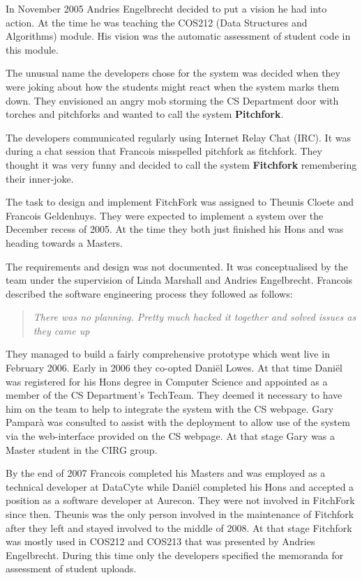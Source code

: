 In November 2005 Andries Engelbrecht decided to put a vision he had into action. At the time he was teaching the COS212 (Data Structures and Algorithms) module. His vision was the automatic assessment of student code in this module. 


The unusual name the developers chose for the system was decided when they were joking about how the students might react when the system marks them down. They envisioned an angry mob storming the CS Department door with torches and pitchforks and wanted to call the system {\bf Pitchfork}.

The developers communicated regularly using Internet Relay Chat (IRC). It was during a chat session that Francois misspelled pitchfork as fitchfork. They thought it was very funny and decided to call the system {\bf Fitchfork} remembering their inner-joke.
     

The task to design and implement FitchFork was assigned to Theunis Cloete and Francois Geldenhuys. They were expected to implement a system over the December recess of 2005. At the time they both just finished his Hons and was heading towards a Masters. 

The requirements and design was not documented. It was conceptualised by the team under the supervision of Linda Marshall and Andries Engelbrecht. Francois described the software engineering process they followed as follows:
\begin{quote}
\textit{There was no planning. Pretty much hacked it together and solved issues as they came up} 
\end{quote}
They managed to build a fairly comprehensive prototype which went live in February 2006. Early in 2006 they co-opted Dani\"{e}l Lowes. At that time  Dani\"{e}l  was registered for his Hons degree in Computer Science and appointed as a member of the CS Department's TechTeam. They deemed it necessary to have him on the team to help to integrate the system with the CS webpage.  Gary Pampar\`{a} was consulted to assist with the deployment to allow use of the system via the web-interface provided on the CS webpage. At that stage Gary was a Master student in the CIRG group.  

By the end of 2007 Francois completed his Masters and was employed as a technical developer at DataCyte while Dani\"{e}l completed his Hons and accepted a position as a software developer at Aurecon. They were not involved in FitchFork since then. Theunis was the only person involved in the maintenance of Fitchfork after they left and stayed involved to the middle of 2008. At that stage Fitchfork was mostly used in COS212 and COS213 that was presented by Andries Engelbrecht. During this time only the developers specified the memoranda for assessment of student uploads.

